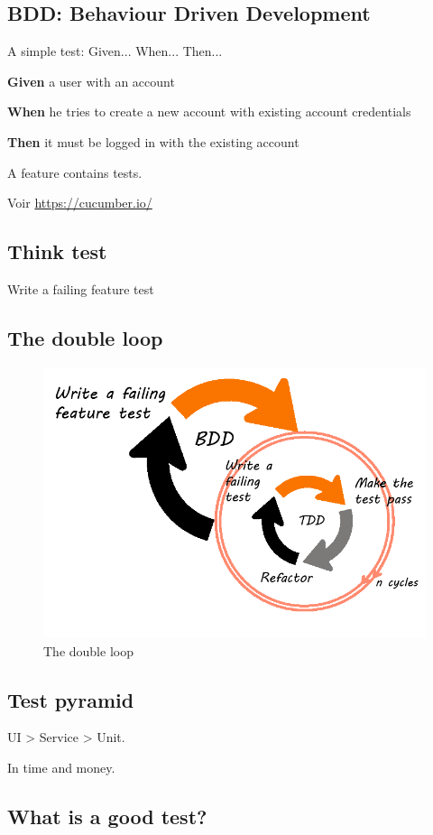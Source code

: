 \documentclass[a4paper,11pt]{article}
\begin{document}
\subsection{BDD: Behaviour Driven Development}

A simple test: Given... When... Then...

\textbf{Given} a user with an account

\textbf{When} he tries to create a new account with existing account credentials

\textbf{Then} it must be logged in with the existing account

A feature contains tests.

Voir \url{https://cucumber.io/}

\subsection{Think test}

Write a failing feature test

\subsection{The double loop}

\begin{figure}[h]
  \centering
  \includegraphics[width = 0.6 \textwidth]{bdd-and-tdd-cycle.png}
  \caption{The double loop}
\end{figure}

\subsection{Test pyramid}

UI > Service > Unit.

In time and money.

\subsection{What is a good test?}
\end{document}
